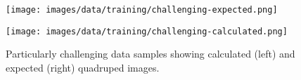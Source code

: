 \begin{figure}
  \centering
  \begin{minipage}[T]{0.45\textwidth}
    \centering
    \texttt{[image: images/data/training/challenging-expected.png]}
  \end{minipage}
  \hfill
  \begin{minipage}[T]{0.45\textwidth}
    \centering
    \texttt{[image: images/data/training/challenging-calculated.png]}
  \end{minipage}
  \hfill

  \caption{Particularly challenging data samples showing calculated (left) and
  expected (right) quadruped images.}
  \label{fig:data-cn-challenging-comparison}
\end{figure}

